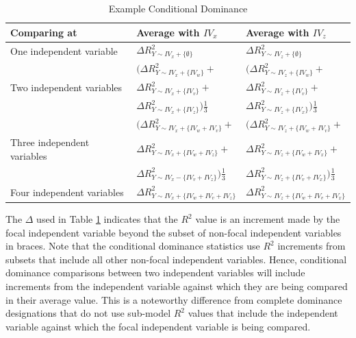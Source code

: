 \documentclass[man]{apa7}
\begin{document}
	\begin{table}[h!]
		\centering
		\caption{\centering Example Conditional Dominance}
		\begin{tabular}{ l | l l }
			Comparing at & Average with $IV_x$ & Average with $IV_z$ \\
			\hline
			One independent variable & $\Delta R^2_{Y \sim IV_x + \{\emptyset\}}$ & $\Delta R^2_{Y \sim IV_z + \{\emptyset\}}$ \\
			\hline
			& $(\Delta R^2_{Y \sim IV_x + \{IV_w\}} + $ & $(\Delta R^2_{Y \sim IV_z + \{IV_w\}} + $ \\
			Two independent variables & $\Delta R^2_{Y \sim IV_x + \{IV_v\}} + $ & $\Delta R^2_{Y \sim IV_z + \{IV_v\}} + $ \\
			& $\Delta R^2_{Y \sim IV_x + \{IV_z\}})\frac{1}{3}$ & $\Delta R^2_{Y \sim IV_z + \{IV_x\}})\frac{1}{3} $ \\
			\hline
			& $(\Delta R^2_{Y \sim IV_x + \{IV_w + IV_v\}} + $ & $(\Delta R^2_{Y \sim IV_z + \{IV_w + IV_v\}} + $ \\
			Three independent variables & $\Delta R^2_{Y \sim IV_x + \{IV_w + IV_z\}} + $ & $\Delta R^2_{Y \sim IV_z + \{IV_w + IV_x\}} + $ \\
			& $\Delta R^2_{Y \sim IV_x - \{IV_v + IV_z\}})\frac{1}{3}$ & $\Delta R^2_{Y \sim IV_z + \{IV_v + IV_x\}})\frac{1}{3}$ \\
			\hline
			Four independent variables & $\Delta R^2_{Y \sim IV_x + \{IV_w + IV_v + IV_z\}}$ & $\Delta R^2_{Y \sim IV_z + \{IV_w + IV_v + IV_x\}}$ \\
			\hline
		\end{tabular}
		\label{tab:excdl}
	\end{table}
	
	The $\Delta$ used in Table \ref{tab:excdl} indicates that the $R^2$ value is an increment made by the focal independent variable beyond the subset of non-focal independent variables in braces.
	Note that the conditional dominance statistics use $R^2$ increments from subsets that include all other non-focal independent variables.
	Hence, conditional dominance comparisons between two independent variables will include increments from the independent variable against which they are being compared in their average value.
	This is a noteworthy difference from complete dominance designations that do not use sub-model $R^2$ values that include the independent variable against which the focal independent variable is being compared.
	
\end{document}
